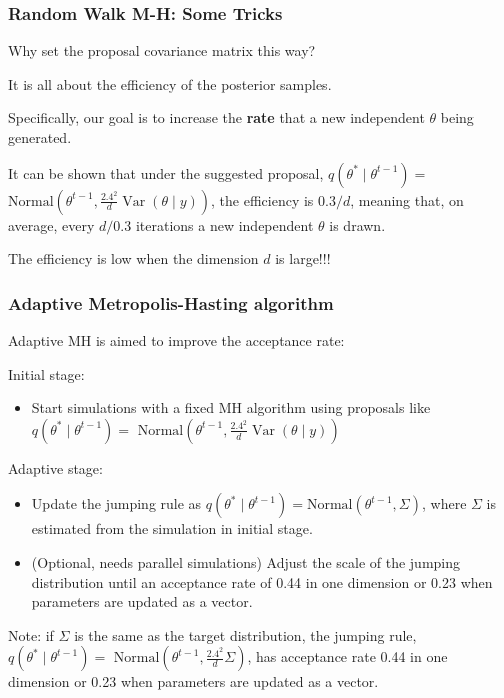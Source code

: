 \documentclass{beamer}
\begin{document}
\begin{frame}
  \frametitle{Random Walk M-H: Some Tricks}
Why set the proposal covariance matrix this way?
\vspace{0.2cm}

It is all about the efficiency of the posterior samples.
\vspace{0.2cm}

Specifically, our goal is to increase the {\bf rate} that a new independent $\theta$ being
generated. 
\vspace{0.2cm}

It can be shown that under the suggested proposal,
$q(\theta^* \mid \theta^{t-1}) = $ $\text{Normal}(\theta^{t-1},
\frac{2.4^2}{d} \operatorname{Var}(\theta \mid y))$, the efficiency is
$0.3/d$, meaning that, on average, every $d/0.3$ iterations a new independent
$\theta$ is drawn.
\vspace{0.2cm}

The efficiency is low when the dimension $d$ is large!!!
\end{frame}


\begin{frame}
  \frametitle{Adaptive Metropolis-Hasting algorithm}
Adaptive MH is aimed to improve the acceptance rate:

Initial stage:
\begin{itemize}
\item Start simulations with a fixed MH algorithm using proposals like $q(\theta^* \mid \theta^{t-1}) = $ $\text{Normal}(\theta^{t-1},
\frac{2.4^2}{d} \operatorname{Var}(\theta \mid y))$ 
\end{itemize}
Adaptive stage:
\begin{itemize}
\item Update the jumping rule as $q(\theta^* \mid \theta^{t-1}) = \text{Normal}(\theta^{t-1},
\Sigma)$, where $\Sigma$ is estimated from the simulation in initial
stage.
\item (Optional, needs parallel simulations) Adjust the scale of the
  jumping distribution until an acceptance rate of 0.44 in one
  dimension or 0.23 when parameters are updated as a vector.
\end{itemize}

Note: if $\Sigma$ is the same as the target distribution, the jumping
rule, $q(\theta^* \mid \theta^{t-1}) = $ $\text{Normal}(\theta^{t-1},
\frac{2.4^2}{d} \Sigma)$, has acceptance rate 0.44 in one
  dimension or 0.23 when parameters are updated as a vector.
\end{frame}
\end{document}
